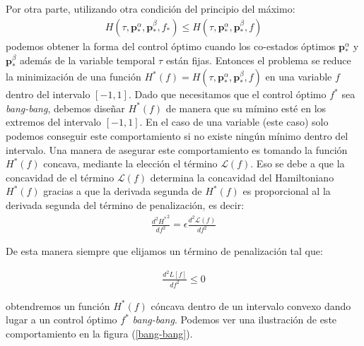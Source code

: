 Por otra parte, utilizando otra condición del principio del máximo:
\begin{gather}
    H(\tau,\bm{p}_*^\alpha,\bm{p}^\beta_*,f_*) \leq H(\tau,\bm{p}_*^\alpha,\bm{p}^\beta_*,f)
\end{gather}
podemos obtener la forma del control óptimo cuando los co-estados óptimos $\bm{p}_*^\alpha$ y $\bm{p}_*^\beta$ además de la variable temporal $\tau$ están fijas. 
%
Entonces el problema se reduce la minimización de una función $H^*(f) = H(\tau,\bm{p}_*^\alpha,\bm{p}^\beta_*,f)$ en una variable $f$ dentro del intervalo $[-1,1]$.
%
Dado que necesitamos que el control óptimo $f^*$ sea \emph{bang-bang}, debemos diseñar  $H^*(f)$ de manera que su mímino esté en los extremos del intervalo $[-1,1]$.
%
En el caso de una variable (este caso) solo podemos conseguir este comportamiento si no existe ningún mínimo dentro del intervalo. Una manera de asegurar este comportamiento es tomando la función $H^*(f)$ concava, mediante la elección el término $\mathcal{L}(f)$. 
%
Eso se debe a que la concavidad de el término $\mathcal{L}(f)$ determina la concavidad del Hamiltoniano $H^*(f)$ gracias a que la derivada segunda de $H^*(f)$ es proporcional al la derivada segunda del término de penalización, es decir:
\begin{gather}
    \frac{d^2{H^*}^2}{df^2} = \epsilon \frac{d^2\mathcal{L}(f)}{df^2} 
\end{gather}

De esta manera siempre que elijamos un término de penalización tal que:

\begin{gather}
    \frac{d^2L[f]}{df^2} \leq 0 
\end{gather}

obtendremos un función $H^*(f)$ cóncava dentro de un intervalo convexo dando lugar a un control óptimo $f^*$  \emph{bang-bang}. Podemos ver una ilustración de este comportamiento en la figura (\ref{bang-bang}).
\newline

